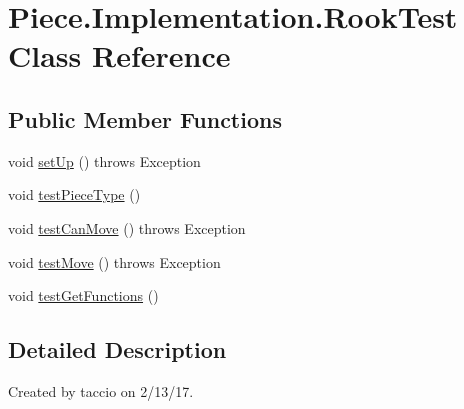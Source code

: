\hypertarget{classPiece_1_1Implementation_1_1RookTest}{\section{Piece.\-Implementation.\-Rook\-Test Class Reference}
\label{classPiece_1_1Implementation_1_1RookTest}
}
\subsection*{Public Member Functions}
\begin{DoxyCompactItemize}
\item 
void \hyperlink{classPiece_1_1Implementation_1_1RookTest_a52c69be339c067d204111f0c5b8a4d1f}{set\-Up} ()  throws Exception 
\item 
void \hyperlink{classPiece_1_1Implementation_1_1RookTest_aeb9a754f956f53d03428f3638b20e6de}{test\-Piece\-Type} ()
\item 
void \hyperlink{classPiece_1_1Implementation_1_1RookTest_a8569a78cd2e7cb7d80b4c2d96a88107e}{test\-Can\-Move} ()  throws Exception
\item 
void \hyperlink{classPiece_1_1Implementation_1_1RookTest_a52065b5c7466bdbff9ec46a61d528ee3}{test\-Move} ()  throws Exception
\item 
void \hyperlink{classPiece_1_1Implementation_1_1RookTest_a99f03e51fac8ac25adec7c5c3044f1bf}{test\-Get\-Functions} ()
\end{DoxyCompactItemize}


\subsection{Detailed Description}
Created by taccio on 2/13/17. 

